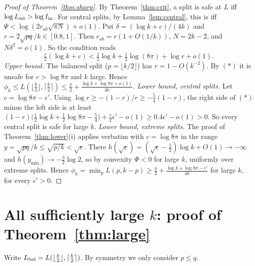 \documentclass[11pt]{amsart}
\theoremstyle{definition}
\begin{document}
\begin{proof}[Proof of Theorem~\ref{thm:sharp}]
By Theorem~\ref{thm:crit}, a split is safe at $L$ iff $\log I_{\rm out}>\log I_{\rm in}$. For central splits, by Lemma~\ref{lem:central},
this is iff $\Psi<\log(2r_{ab}\sqrt{\pi N})+o(1)$. Put $\delta=(\log k+c)/(4k)$ and $r=2\sqrt{pq}/k\in[0.8,1]$. Then $r_{ab}=r(1+O(1/k))$,
$N=2k-2$, and $N\delta^2=o(1)$. So the condition reads
\[
\tfrac r2(\log k+c)<\tfrac12\log k+\tfrac12\log(8\pi)+\log r+o(1).\tag{$\ast$}
\]
\emph{Upper bound.} The balanced split ($p=\lfloor k/2\rfloor$) has $r=1-O(k^{-2})$. By $(\ast)$ it is unsafe for $c>\log8\pi$ and $k$ large.
Hence $\phi_k\le L(\lfloor\frac k2\rfloor,\lceil\frac k2\rceil)\le\frac\pi2+\frac{\log k+\log8\pi+o(1)}{4k}$.
\emph{Lower bound, central splits.} Let $c=\log8\pi-\epsilon'$. Using $\log r\ge-(1-r)/r\ge-\frac54(1-r)$, the right side of $(\ast)$ minus the
left side is at least $(1-r)\big(\frac12\log k+\frac12\log8\pi-\frac54\big)+\frac r2\epsilon'-o(1)\ge0.4\epsilon'-o(1)>0$. So every central split
is safe for large $k$.
\emph{Lower bound, extreme splits.} The proof of Theorem~\ref{thm:lower}(i) applies verbatim with $c=\log8\pi$ in the range
$y=\sqrt{pq}/k\le\sqrt{p/k}<\sqrt\epsilon$. There $h(\sqrt\epsilon)=(\sqrt\epsilon-\frac12)\log k+O(1)\to-\infty$ and
$h(y_{\min})\to-\frac32\log2$, so by convexity $\Phi<0$ for large $k$, uniformly over extreme splits.
Hence $\phi_k=\min_pL(p,k-p)\ge\frac\pi2+\frac{\log k+\log8\pi-\epsilon'}{4k}$ for large $k$, for every $\epsilon'>0$.
\end{proof}

\section{All sufficiently large $k$: proof of Theorem~\ref{thm:large}}\label{sec:large}

Write $L_{\rm bal}=L(\lfloor\frac k2\rfloor,\lceil\frac k2\rceil)$. By symmetry we only consider $p\le q$.
\end{document}
